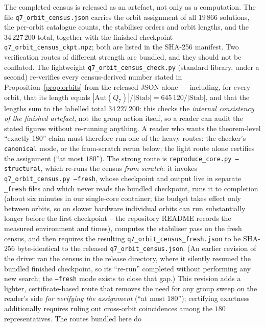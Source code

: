\documentclass[12pt,a4paper]{article}
\theoremstyle{definition}
\begin{document}
The completed census is released as an artefact, not only as a computation.
The file \texttt{q7\_orbit\_census.json} carries the orbit assignment of all
$19\,866$ solutions, the per-orbit catalogue counts, the stabiliser orders
and orbit lengths, and the $34\,227\,200$ total, together with the finished
checkpoint \texttt{q7\_orbit\_census\_ckpt.npz}; both are listed in the
SHA-256 manifest. Two verification routes of different strength are
bundled, and they should not be conflated. The lightweight
\texttt{q7\_orbit\_census\_check.py} (standard library, under a second)
re-verifies every census-derived number stated in
Proposition~\ref{prop:orbits} from the released JSON alone --- including,
for every orbit, that its length equals
$|\mathrm{Aut}(Q_7)|/|\mathrm{Stab}|=645\,120/|\mathrm{Stab}|$, and that
the lengths sum to the labelled total $34\,227\,200$: this checks
the \emph{internal consistency of the finished artefact}, not the group
action itself, so a reader can audit the stated figures without re-running
anything. A reader who wants the theorem-level ``exactly $180$'' claim
must therefore run one of the heavy routes: the checker's
\texttt{-{}-canonical} mode, or the from-scratch rerun below; the light
route alone certifies the assignment (``at most $180$'').
The strong route is \texttt{reproduce\_core.py --structural},
which re-runs the census \emph{from scratch}: it invokes
\texttt{q7\_orbit\_census.py --fresh}, whose checkpoint and output live
in separate \texttt{\_fresh} files and which never reads the bundled
checkpoint, runs it to completion (about six minutes in our single-core
container; the budget takes effect only between orbits, so on slower
hardware individual orbits can run substantially longer before the first
checkpoint -- the repository README records the measured environment and
times), computes the stabiliser pass on the fresh census, and then
requires the resulting \texttt{q7\_orbit\_census\_fresh.json} to be
SHA-256 byte-identical to the released \texttt{q7\_orbit\_census.json}.
(An earlier revision of the driver ran the census in the release directory,
where it silently resumed the bundled finished checkpoint, so its
``re-run'' completed without performing any new search; the
\texttt{--fresh} mode exists to close that gap.) This revision adds a
lighter, certificate-based route that removes the need for any group sweep
on the reader's side \emph{for verifying the assignment} (``at most
$180$''); certifying exactness additionally requires ruling out cross-orbit
coincidences among the $180$ representatives. The routes bundled here do
\end{document}
